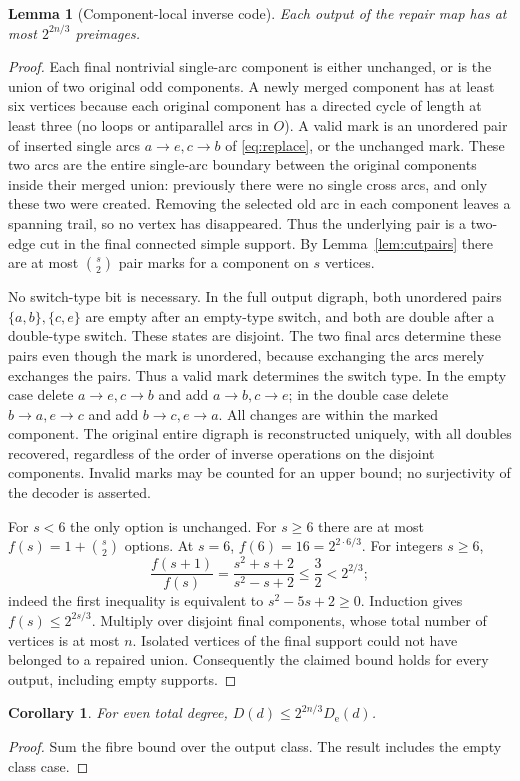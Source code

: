 \documentclass[11pt]{article}
\newtheorem{lemma}[theorem]{Lemma}
\newtheorem{corollary}[theorem]{Corollary}
\theoremstyle{remark}\newtheorem{remark}[theorem]{Remark}
\newcommand{\De}{D_{\mathrm e}}
\begin{document}
\begin{lemma}[Component-local inverse code]\label{lem:fibers}
Each output of the repair map has at most $2^{2n/3}$ preimages.
\end{lemma}
\begin{proof}
Each final nontrivial single-arc component is either unchanged, or is the union of two original odd components. A newly merged component has at least six vertices because each original component has a directed cycle of length at least three (no loops or antiparallel arcs in $O$). A valid mark is an unordered pair of inserted single arcs $a\to e,c\to b$ of \eqref{eq:replace}, or the unchanged mark. These two arcs are the entire single-arc boundary between the original components inside their merged union: previously there were no single cross arcs, and only these two were created. Removing the selected old arc in each component leaves a spanning trail, so no vertex has disappeared. Thus the underlying pair is a two-edge cut in the final connected simple support. By Lemma~\ref{lem:cutpairs} there are at most $\binom{s}{2}$ pair marks for a component on $s$ vertices.

No switch-type bit is necessary. In the full output digraph, both unordered pairs $\{a,b\},\{c,e\}$ are empty after an empty-type switch, and both are double after a double-type switch. These states are disjoint. The two final arcs determine these pairs even though the mark is unordered, because exchanging the arcs merely exchanges the pairs. Thus a valid mark determines the switch type. In the empty case delete $a\to e,c\to b$ and add $a\to b,c\to e$; in the double case delete $b\to a,e\to c$ and add $b\to c,e\to a$. All changes are within the marked component. The original entire digraph is reconstructed uniquely, with all doubles recovered, regardless of the order of inverse operations on the disjoint components. Invalid marks may be counted for an upper bound; no surjectivity of the decoder is asserted.

For $s<6$ the only option is unchanged. For $s\ge6$ there are at most $f(s)=1+\binom{s}{2}$ options. At $s=6$, $f(6)=16=2^{2\cdot6/3}$. For integers $s\ge6$,
\[
 \frac{f(s+1)}{f(s)}=\frac{s^2+s+2}{s^2-s+2}\le\frac32<2^{2/3};
\]
indeed the first inequality is equivalent to $s^2-5s+2\ge0$. Induction gives $f(s)\le 2^{2s/3}$. Multiply over disjoint final components, whose total number of vertices is at most $n$. Isolated vertices of the final support could not have belonged to a repaired union. Consequently the claimed bound holds for every output, including empty supports.
\end{proof}
\begin{corollary}\label{cor:repair}
For even total degree, $D(d)\le2^{2n/3}\De(d)$.
\end{corollary}
\begin{proof}
Sum the fibre bound over the output class. The result includes the empty class case.
\end{proof}
\end{document}
